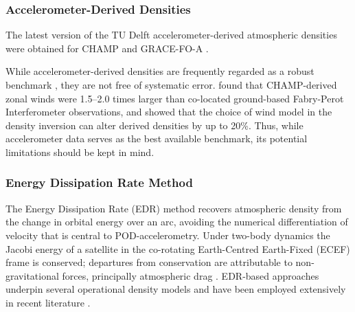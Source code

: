 \documentclass{agujournal2019}
\begin{document}
\subsubsection{Accelerometer-Derived Densities}

The latest version of the TU Delft accelerometer-derived atmospheric densities were obtained for CHAMP and GRACE-FO-A \cite{Siemes2023NewGRACE-FO}.

While accelerometer-derived densities are frequently regarded as a robust benchmark \cite{Sutton2021TowardSatellites, Mehta2022SatelliteOperations, Mutschler2023Physics-BasedData}, they are not free of systematic error.  found that CHAMP-derived zonal winds were 1.5--2.0 times larger than co-located ground-based Fabry-Perot Interferometer observations, and  showed that the choice of wind model in the density inversion can alter derived densities by up to 20\%. Thus, while accelerometer data serves as the best available benchmark, its potential limitations should be kept in mind.

\subsubsection{Energy Dissipation Rate Method}
\label{sec:edr-method}

The Energy Dissipation Rate (EDR) method recovers atmospheric density from
the change in orbital energy over an arc, avoiding the numerical
differentiation of velocity that is central to POD-accelerometry. Under
two-body dynamics the Jacobi energy of a satellite in the co-rotating
Earth-Centred Earth-Fixed (ECEF) frame is conserved; departures from conservation are attributable to
non-gravitational forces, principally atmospheric drag
\cite{Picone2005ThermosphericSets, King-Hele1987TheLifetimes}. EDR-based
approaches underpin several operational density models
\cite{Storz2002HASDMRates, Bowman2003HighReview} and have been employed
extensively in recent literature
\cite{Hejduk2013ASolutions, Pilinski2016ImprovedSpecification,
Sutton2021TowardSatellites}.
\end{document}
